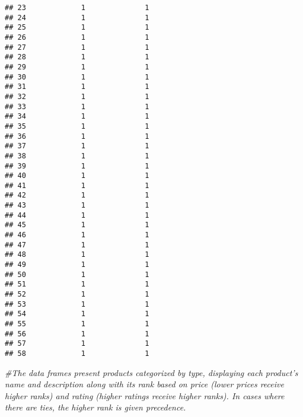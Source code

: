 \documentclass[
]{article}
\newenvironment{Shaded}{\begin{snugshade}}{\end{snugshade}}
\newcommand{\CommentTok}[1]{\textcolor[rgb]{0.56,0.35,0.01}{\textit{#1}}}
\begin{document}
\begin{verbatim}
## 23             1              1
## 24             1              1
## 25             1              1
## 26             1              1
## 27             1              1
## 28             1              1
## 29             1              1
## 30             1              1
## 31             1              1
## 32             1              1
## 33             1              1
## 34             1              1
## 35             1              1
## 36             1              1
## 37             1              1
## 38             1              1
## 39             1              1
## 40             1              1
## 41             1              1
## 42             1              1
## 43             1              1
## 44             1              1
## 45             1              1
## 46             1              1
## 47             1              1
## 48             1              1
## 49             1              1
## 50             1              1
## 51             1              1
## 52             1              1
## 53             1              1
## 54             1              1
## 55             1              1
## 56             1              1
## 57             1              1
## 58             1              1
\end{verbatim}

\begin{Shaded}
\begin{Highlighting}[]
\CommentTok{\#The data frames present products categorized by type, displaying each product’s name and description along with its rank based on price (lower prices receive higher ranks) and rating (higher ratings receive higher ranks). In cases where there are ties, the higher rank is given precedence.}
\end{Highlighting}
\end{Shaded}
\end{document}
